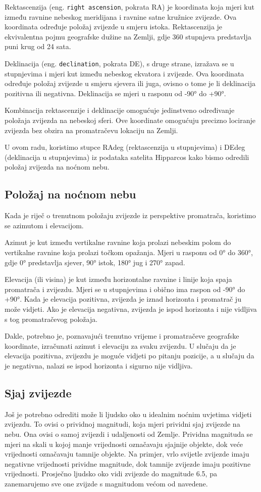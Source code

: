 \documentclass[a4paper,12pt]{article}
\begin{document}
Rektascenzija (eng. \texttt{right ascension}, pokrata RA) je koordinata koja mjeri kut između ravnine nebeskog meridijana i ravnine satne kružnice zvijezde. Ova koordinata određuje položaj zvijezde u smjeru istoka. Rektascenzija je ekvivalentna pojmu geografske dužine na Zemlji, gdje 360 stupnjeva predstavlja puni krug od 24 sata.

Deklinacija (eng. \texttt{declination}, pokrata DE), s druge strane, izražava se u stupnjevima i mjeri kut između nebeskog ekvatora i zvijezde. Ova koordinata određuje položaj zvijezde u smjeru sjevera ili juga, ovisno o tome je li deklinacija pozitivna ili negativna. Deklinacija se mjeri u rasponu od -90° do +90°.

Kombinacija rektascenzije i deklinacije omogućuje jedinstveno određivanje položaja zvijezda na nebeskoj sferi. Ove koordinate omogućuju precizno lociranje zvijezda bez obzira na promatračevu lokaciju na Zemlji.

U ovom radu, koristimo stupce RAdeg (rektascenzija u stupnjevima) i DEdeg (deklinacija u stupnjevima) iz podataka satelita Hipparcos kako bismo odredili položaj zvijezda na noćnom nebu.

\subsection{Položaj na noćnom nebu}
Kada je riječ o trenutnom položaju zvijezde iz perspektive promatrača, koristimo se azimutom i elevacijom.

Azimut je kut između vertikalne ravnine koja prolazi nebeskim polom do vertikalne ravnine koja prolazi točkom opažanja. Mjeri u rasponu od 0° do 360°, gdje 0° predstavlja sjever, 90° istok, 180° jug i 270° zapad.

Elevacija (ili visina) je kut između horizontalne ravnine i linije koja spaja promatrača i zvijezdu. Mjeri se u stupnjevima i obično ima raspon od -90° do +90°. Kada je elevacija pozitivna, zvijezda je iznad horizonta i promatrač ju može vidjeti. Ako je elevacija negativna, zvijezda je ispod horizonta i nije vidljiva s tog promatračevog položaja.

Dakle, potrebno je, poznavajući trenutno vrijeme i promatračeve geografske koordinate, izračunati azimut i elevaciju za svaku zvijezdu. U slučaju da je elevacija pozitivna, zvijezdu je moguće vidjeti po pitanju pozicije, a u slučaju da je negativna, nalazi se ispod horizonta i sigurno nije vidljiva.

\subsection{Sjaj zvijezde}
Još je potrebno odrediti može li ljudsko oko u idealnim noćnim uvjetima vidjeti zvijezdu. To ovisi o prividnoj magnitudi, koja mjeri prividni sjaj zvijezde na nebu. Ona ovisi o samoj zvijezdi i udaljenosti od Zemlje.
Prividna magnituda se mjeri na skali u kojoj manje vrijednosti označavaju sjajnije objekte, dok veće vrijednosti označavaju tamnije objekte. Na primjer, vrlo svijetle zvijezde imaju negativne vrijednosti prividne magnitude, dok tamnije zvijezde imaju pozitivne vrijednosti. Prosječno ljudsko oko vidi zvijezde do magnitude 6.5, pa zanemarujemo sve one zvijzde s magnitudom većom od navedene.
\end{document}
